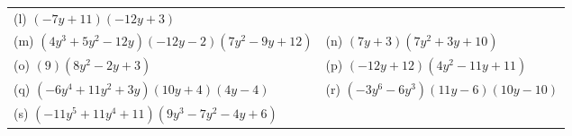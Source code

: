 \begin{enumerate}[noitemsep, label=\textbf{\arabic*}. ]
{\begin{tabular}[t]{|l|l|}
        (l) $\left(-7y+11\right)\left(-12y+3\right)$%
     \tabularnewline\cline{1-1}\cline{2-2}
        (m) $\left(4{y}^{3}+5{y}^{2}-12y\right)\left(-12y-2\right)\left(7{y}^{2}-9y+12\right)$ &
        (n) $\left(7y+3\right)\left(7{y}^{2}+3y+10\right)$%
     \tabularnewline\cline{1-1}\cline{2-2}
        (o) $\left(9\right)\left(8{y}^{2}-2y+3\right)$ &
        (p) $\left(-12y+12\right)\left(4{y}^{2}-11y+11\right)$%
     \tabularnewline\cline{1-1}\cline{2-2}
        (q) $\left(-6{y}^{4}+11{y}^{2}+3y\right)\left(10y+4\right)\left(4y-4\right)$ &
        (r) $\left(-3{y}^{6}-6{y}^{3}\right)\left(11y-6\right)\left(10y-10\right)$%
     \tabularnewline\cline{1-1}\cline{2-2}
        (s) $\left(-11{y}^{5}+11{y}^{4}+11\right)\left(9{y}^{3}-7{y}^{2}-4y+6\right)$ &

\end{tabular}}
\end{enumerate}
